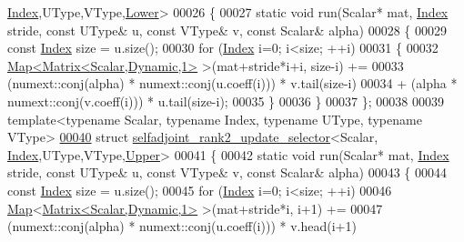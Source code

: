 \begin{DoxyCode}
      \hyperlink{namespace_eigen_a62e77e0933482dafde8fe197d9a2cfde}{Index},UType,VType,\hyperlink{group__enums_gga39e3366ff5554d731e7dc8bb642f83cda891792b8ed394f7607ab16dd716f60e6}{Lower}>
00026 \{
00027   \textcolor{keyword}{static} \textcolor{keywordtype}{void} run(Scalar* mat, \hyperlink{namespace_eigen_a62e77e0933482dafde8fe197d9a2cfde}{Index} stride, \textcolor{keyword}{const} UType& u, \textcolor{keyword}{const} VType& v, \textcolor{keyword}{const} Scalar& alpha)
00028   \{
00029     \textcolor{keyword}{const} \hyperlink{namespace_eigen_a62e77e0933482dafde8fe197d9a2cfde}{Index} size = u.size();
00030     \textcolor{keywordflow}{for} (\hyperlink{namespace_eigen_a62e77e0933482dafde8fe197d9a2cfde}{Index} i=0; i<size; ++i)
00031     \{
00032       \hyperlink{group___core___module_class_eigen_1_1_map}{Map<Matrix<Scalar,Dynamic,1>} >(mat+stride*i+i, size-i) +=
00033                         (numext::conj(alpha) * numext::conj(u.coeff(i))) * v.tail(size-i)
00034                       + (alpha * numext::conj(v.coeff(i))) * u.tail(size-i);
00035     \}
00036   \}
00037 \};
00038 
00039 \textcolor{keyword}{template}<\textcolor{keyword}{typename} Scalar, \textcolor{keyword}{typename} Index, \textcolor{keyword}{typename} UType, \textcolor{keyword}{typename} VType>
\hyperlink{struct_eigen_1_1internal_1_1selfadjoint__rank2__update__selector_3_01_scalar_00_01_index_00_01_uf7a068ce7ab78b9bb81bd0ca858e99d2}{00040} \textcolor{keyword}{struct }\hyperlink{struct_eigen_1_1internal_1_1selfadjoint__rank2__update__selector}{selfadjoint\_rank2\_update\_selector}<Scalar,
      \hyperlink{namespace_eigen_a62e77e0933482dafde8fe197d9a2cfde}{Index},UType,VType,\hyperlink{group__enums_gga39e3366ff5554d731e7dc8bb642f83cda6bcb58be3b8b8ec84859ce0c5ac0aaec}{Upper}>
00041 \{
00042   \textcolor{keyword}{static} \textcolor{keywordtype}{void} run(Scalar* mat, \hyperlink{namespace_eigen_a62e77e0933482dafde8fe197d9a2cfde}{Index} stride, \textcolor{keyword}{const} UType& u, \textcolor{keyword}{const} VType& v, \textcolor{keyword}{const} Scalar& alpha)
00043   \{
00044     \textcolor{keyword}{const} \hyperlink{namespace_eigen_a62e77e0933482dafde8fe197d9a2cfde}{Index} size = u.size();
00045     \textcolor{keywordflow}{for} (\hyperlink{namespace_eigen_a62e77e0933482dafde8fe197d9a2cfde}{Index} i=0; i<size; ++i)
00046       \hyperlink{group___core___module_class_eigen_1_1_map}{Map}<\hyperlink{group___core___module}{Matrix<Scalar,Dynamic,1>} >(mat+stride*i, i+1) +=
00047                         (numext::conj(alpha)  * numext::conj(u.coeff(i))) * v.head(i+1)

\end{DoxyCode}
